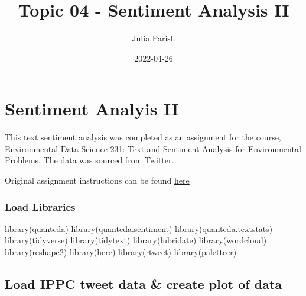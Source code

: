 \documentclass[
]{article}
\title{Topic 04 - Sentiment Analysis II}
\author{Julia Parish}
\date{2022-04-26}
\newenvironment{Shaded}{\begin{snugshade}}{\end{snugshade}}
\newcommand{\FunctionTok}[1]{\textcolor[rgb]{0.00,0.00,0.00}{#1}}
\newcommand{\NormalTok}[1]{#1}
\begin{document}
\maketitle

\hypertarget{sentiment-analyis-ii}{%
\section{Sentiment Analyis II}\label{sentiment-analyis-ii}}

This text sentiment analysis was completed as an assignment for the
course, Environmental Data Science 231: Text and Sentiment Analysis for
Environmental Problems. The data was sourced from Twitter.

Original assignment instructions can be found
\href{https://maro406.github.io/EDS_231-text-sentiment/topic_4.html}{here}

\hypertarget{load-libraries}{%
\subsubsection{Load Libraries}\label{load-libraries}}

\begin{Shaded}
\begin{Highlighting}[]
\FunctionTok{library}\NormalTok{(quanteda)}
\FunctionTok{library}\NormalTok{(quanteda.sentiment)}
\FunctionTok{library}\NormalTok{(quanteda.textstats)}
\FunctionTok{library}\NormalTok{(tidyverse)}
\FunctionTok{library}\NormalTok{(tidytext)}
\FunctionTok{library}\NormalTok{(lubridate)}
\FunctionTok{library}\NormalTok{(wordcloud)}
\FunctionTok{library}\NormalTok{(reshape2)}
\FunctionTok{library}\NormalTok{(here)}
\FunctionTok{library}\NormalTok{(rtweet)}
\FunctionTok{library}\NormalTok{(paletteer)}
\end{Highlighting}
\end{Shaded}

\hypertarget{load-ippc-tweet-data-create-plot-of-data}{%
\subsection{Load IPPC tweet data \& create plot of
data}\label{load-ippc-tweet-data-create-plot-of-data}}
\end{document}
